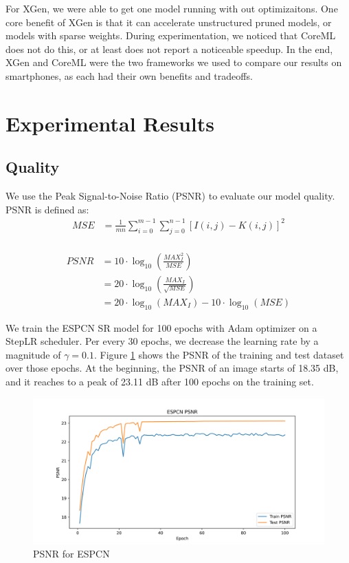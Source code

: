 \documentclass{article}
\begin{document}
For XGen, we were able to get one model running with out optimizaitons. One core benefit of XGen is that it can accelerate unstructured pruned models, or models with sparse weights. During experimentation, we noticed that CoreML does not do this, or at least does not report a noticeable speedup. In the end, XGen and CoreML were the two frameworks we used to compare our results on smartphones, as each had their own benefits and tradeoffs. 



\section{Experimental Results}
\subsection{Quality}
We use the Peak Signal-to-Noise Ratio (PSNR) to evaluate our model quality. PSNR is defined as:
\begin{equation}
\begin{split}
MSE &= \frac{1}{m n} \sum_{i=0}^{m-1} \sum_{j=0}^{n-1}[I(i, j)-K(i, j)]^2 \\
\end{split}
\end{equation}


\begin{equation}
\begin{split}
PSNR &=10 \cdot \log _{10}\left(\frac{M A X_I^2}{M S E}\right) \\
&=20 \cdot \log _{10}\left(\frac{M A X_I}{\sqrt{M S E}}\right) \\
&=20 \cdot \log _{10}\left(M A X_I\right)-10 \cdot \log _{10}(M S E)
\end{split}
\end{equation}

We train the ESPCN SR model for 100 epochs with Adam optimizer on a StepLR scheduler. Per every 30 epochs, we decrease the learning rate by a magnitude of $\gamma=0.1$. Figure \ref{fig:psnr} shows the PSNR of the training and test dataset over those epochs. At the beginning, the PSNR of an image starts of 18.35 dB, and it reaches to a peak of 23.11 dB after 100 epochs on the training set. 

\begin{figure}
    \centerline{\includegraphics[width=6in]{../final/figures/SuperResolutionTwitter_PSNR.png}}
    \caption{PSNR for ESPCN}
    \label{fig:psnr}
\end{figure}
\end{document}
